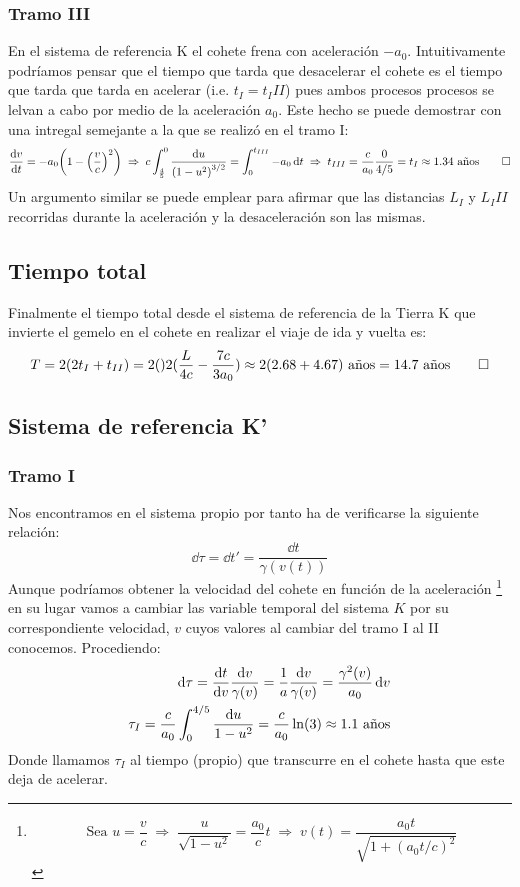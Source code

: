 \documentclass[11pt]{article}
\begin{document}
\subsubsection*{Tramo III} 
En el sistema de referencia K el cohete frena con aceleración $-a_0$. Intuitivamente podríamos pensar que el tiempo que tarda que desacelerar el cohete es el tiempo que tarda que tarda en acelerar (i.e. $t_I = t_III$) pues ambos procesos procesos se lelvan a cabo por medio de la aceleración $a_0$. Este hecho se puede demostrar con una intregal semejante a la que se realizó en el tramo I:
\begin{align*}
    \dv{v}{t} = -a_0 \qty(1 - \qty(\dfrac{v}{c})^2) \;\Rightarrow\; c\int_{\frac{4}{5}}^{0} \dfrac{\dd{u}}{\qty(1-u^2)^{3/2}} = \int_{0}^{t_{III}} -a_0 \dd{t} \;\Rightarrow\; t_{III} = \dfrac{c}{a_0}\dfrac{0}{4/5} = t_{I} \approx 1.34 \textrm{ años} \qed 
\end{align*}
Un argumento similar se puede emplear para afirmar que las distancias $L_I$ y $L_III$ recorridas durante la aceleración y la desaceleración son las mismas.
\subsection*{Tiempo total}
Finalmente el tiempo total desde el sistema de referencia de la Tierra K que invierte el gemelo en el cohete en realizar el viaje de ida y vuelta es: 
\begin{equation}
    T = 2(2t_I + t_{II}) = 2\qty 2(\dfrac{L}{4c}-\dfrac{7c}{3a_0}) \approx 2(2.68 + 4.67) \textrm{ años} = 14.7 \textrm{ años} \qed
\end{equation}
\subsection{Sistema de referencia K'}
\subsubsection*{Tramo I}
Nos encontramos en el sistema propio por tanto ha de verificarse la siguiente relación: 
\begin{equation}
    \label{Tiempo propio}
    \dd{\tau} = \dd{t'} = \dfrac{\dd{t}}{\gamma(v(t))}
\end{equation}
Aunque podríamos obtener la velocidad del cohete en función de la aceleración \footnote{
    \begin{equation*}
        \textrm{Sea } u = \dfrac{v}{c} \;\Rightarrow\; \dfrac{u}{\sqrt{1-u^2}} = \dfrac{a_0}{c} t \;\Rightarrow\; v(t) = \dfrac{a_0 t}{\sqrt{1 + (a_0 t/c)^2}} 
    \end{equation*}
} en su lugar vamos a cambiar las variable temporal del sistema $K$ por su correspondiente velocidad, $v$ cuyos valores al cambiar del tramo I al II conocemos. Procediendo: 
\begin{align}
    \dd{\tau} = \dv{t}{v} \dfrac{\dd{v}}{\gamma(v)} = \dfrac{1}{a} \dfrac{\dd{v}}{\gamma(v)} = \dfrac{\gamma^2(v)}{a_0}\dd{v}\\
    \tau_I =  \dfrac{c}{a_0}\int_{0}^{4/5} \dfrac{\dd{u}}{1-u^2} = \dfrac{c }{a_0} \ln(3) \approx 1.1 \textrm{ años} 
\end{align} 
Donde llamamos $\tau_I$ al tiempo (propio) que transcurre en el cohete hasta que este deja de acelerar.
\end{document}
